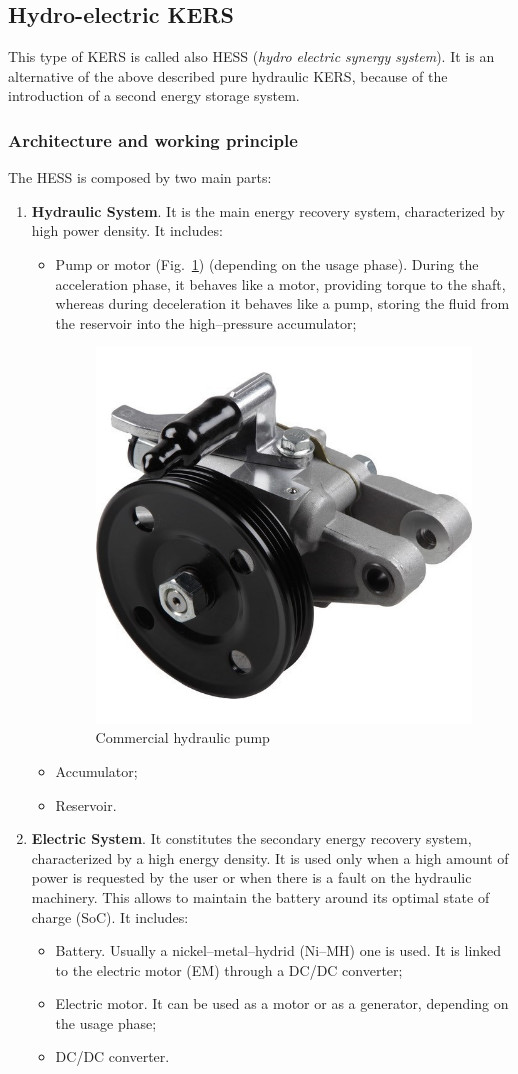 \documentclass[11pt]{article}
\begin{document}
\subsection{Hydro-electric KERS}

This type of KERS is called also HESS (\textit{hydro electric synergy system}). It is an alternative of the above described pure hydraulic KERS, because of the introduction of a second energy storage system.

\subsubsection{Architecture and working principle}

The HESS is composed by two main parts:

\begin{enumerate}
	\item \textbf{Hydraulic System}. It is the main energy recovery system, characterized by high power density. It includes:
	\begin{itemize}
		\item Pump or motor (Fig.~\ref{hydraulic_pump}) (depending on the usage phase). During the acceleration phase, it behaves like a motor, providing torque to the shaft, whereas during deceleration it behaves like a pump, storing the fluid from the reservoir into the high--pressure accumulator;
		\begin{figure}[H]
			\centering
			\includegraphics[width=.3\textwidth]{Images/State_of_the_art/Hydraulic Pump.jpg}
			\caption{Commercial hydraulic pump}
			\label{hydraulic_pump}
		\end{figure}
		
		\item Accumulator;
		\item Reservoir.
	\end{itemize}
	\item \textbf{Electric System}. It constitutes the secondary energy recovery system, characterized by a high energy density. It is used only when a high amount of power is requested by the user or when there is a fault on the hydraulic machinery. This allows to maintain the battery around its optimal state of charge (SoC). It includes:
	\begin{itemize}
		\item Battery. Usually a nickel--metal--hydrid (Ni--MH) one is used. It is linked to the electric motor (EM) through a DC/DC converter;
		\item Electric motor. It can be used as a motor or as a generator, depending on the usage phase;
		\item DC/DC converter.
	\end{itemize}	
\end{enumerate}
\end{document}
